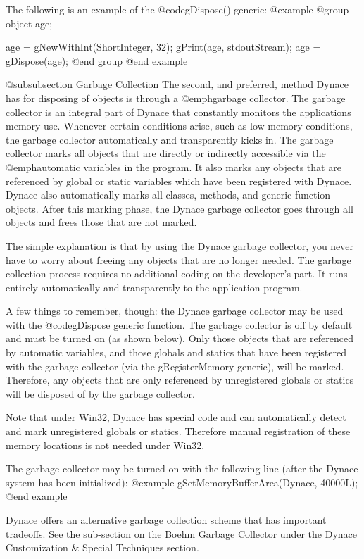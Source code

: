 The following is an example of the @code{gDispose()} generic:
@example
@group
        object    age;

        age = gNewWithInt(ShortInteger, 32);
        gPrint(age, stdoutStream);
        age = gDispose(age);
@end group
@end example

@subsubsection Garbage Collection
The second, and preferred, method Dynace has for disposing of objects is
through a @emph{garbage collector}.  The garbage collector is an
integral part of Dynace that constantly monitors the applications memory
use.  Whenever certain conditions arise, such as low memory conditions,
the garbage collector automatically and transparently kicks in.  The
garbage collector marks all objects that are directly or indirectly
accessible via the @emph{automatic} variables in the program.  It also
marks any objects that are referenced by global or static variables
which have been registered with Dynace.  Dynace also automatically marks all
classes, methods, and generic function objects.  After this marking
phase, the Dynace garbage collector goes through all objects and frees
those that are not marked.

The simple explanation is that by using the Dynace garbage collector, you
never have to worry about freeing any objects that are no longer
needed.  The garbage collection process requires no additional coding
on the developer's part.  It runs entirely automatically and
transparently to the application program.

A few things to remember, though: the Dynace garbage collector may be used
with the @code{gDispose} generic function.  The garbage collector is off
by default and must be turned on (as shown below).  Only those objects
that are referenced by automatic variables, and those globals and
statics that have been registered with the garbage collector (via the
gRegisterMemory generic), will be marked.  Therefore, any objects that
are only referenced by unregistered globals or statics will be disposed
of by the garbage collector.

Note that under Win32, Dynace has special code and can automatically
detect and mark unregistered globals or statics.  Therefore manual
registration of these memory locations is not needed under Win32.

The garbage collector may be turned on with the following line (after
the Dynace system has been initialized):
@example
        gSetMemoryBufferArea(Dynace, 40000L);
@end example

Dynace offers an alternative garbage collection scheme that has important
tradeoffs.  See the sub-section on the Boehm Garbage Collector under the
Dynace Customization & Special Techniques section.

